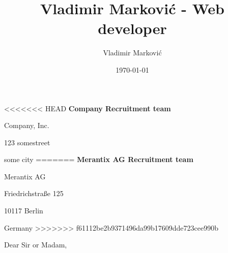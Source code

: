 \documentclass{article}
\title{Vladimir Marković - Web developer}
\author{Vladimir Marković}
\date{\today}
\begin{document}
\sffamily

\vspace{0mm}
\setlength{\parindent}{1mm}
\large
<<<<<<< HEAD
\textbf{Company Recruitment team}

\vspace{0mm}
\setlength{\parindent}{1mm}
Company, Inc.

\vspace{0mm}
\setlength{\parindent}{1mm}
123 somestreet

\vspace{0mm}
\setlength{\parindent}{1mm}
some city
=======
\textbf{Merantix AG Recruitment team}

\vspace{0mm}
\setlength{\parindent}{1mm}
Merantix AG

\vspace{0mm}
\setlength{\parindent}{1mm}
Friedrichstraße 125

\vspace{0mm}
\setlength{\parindent}{1mm}
10117 Berlin

\vspace{0mm}
\setlength{\parindent}{1mm}
Germany
>>>>>>> f61112be2b9371496da99b17609dde723cee990b

\vspace{5mm}
\setlength{\parindent}{1mm}
\usdate{\today}

\vspace{5mm}
\setlength{\parindent}{1mm}
Dear Sir or Madam,

\vspace{5mm}
\end{document}
